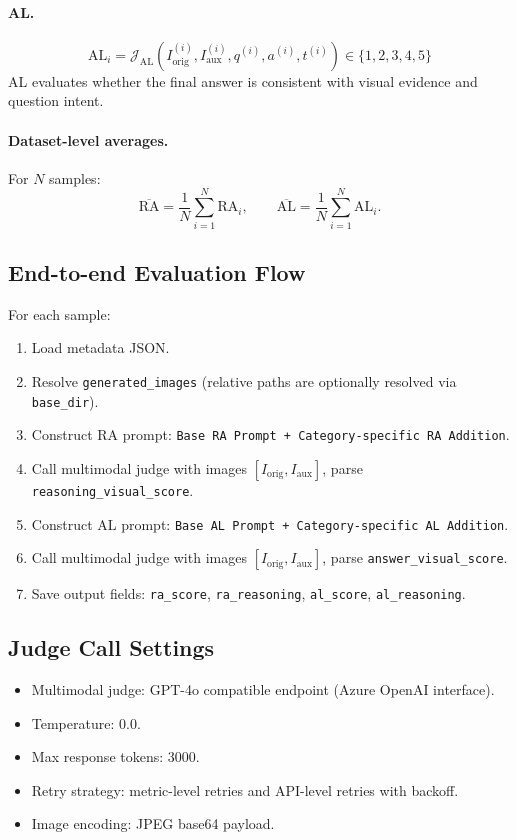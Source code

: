 \documentclass{article}
\theoremstyle{plain}
\theoremstyle{definition}
\theoremstyle{remark}
\begin{document}
\paragraph{AL.}
\[
\mathrm{AL}_i = \mathcal{J}_{\mathrm{AL}}\!\left(I_{\text{orig}}^{(i)}, I_{\text{aux}}^{(i)},
q^{(i)}, a^{(i)}, t^{(i)}\right)\in\{1,2,3,4,5\}
\]
AL evaluates whether the final answer is consistent with visual evidence and question intent.

\paragraph{Dataset-level averages.}
For \(N\) samples:
\[
\overline{\mathrm{RA}}=\frac{1}{N}\sum_{i=1}^N \mathrm{RA}_i,\qquad
\overline{\mathrm{AL}}=\frac{1}{N}\sum_{i=1}^N \mathrm{AL}_i.
\]

\subsection{End-to-end Evaluation Flow}
For each sample:
\begin{enumerate}
\item Load metadata JSON.
\item Resolve \texttt{generated\_images} (relative paths are optionally resolved via \texttt{base\_dir}).
\item Construct RA prompt: \texttt{Base RA Prompt + Category-specific RA Addition}.
\item Call multimodal judge with images \([I_{\text{orig}}, I_{\text{aux}}]\), parse \texttt{reasoning\_visual\_score}.
\item Construct AL prompt: \texttt{Base AL Prompt + Category-specific AL Addition}.
\item Call multimodal judge with images \([I_{\text{orig}}, I_{\text{aux}}]\), parse \texttt{answer\_visual\_score}.
\item Save output fields:
\texttt{ra\_score}, \texttt{ra\_reasoning}, \texttt{al\_score}, \texttt{al\_reasoning}.
\end{enumerate}

\subsection{Judge Call Settings}
\begin{itemize}
\item Multimodal judge: GPT-4o compatible endpoint (Azure OpenAI interface).
\item Temperature: \(0.0\).
\item Max response tokens: \(3000\).
\item Retry strategy: metric-level retries and API-level retries with backoff.
\item Image encoding: JPEG base64 payload.
\end{itemize}
\end{document}

